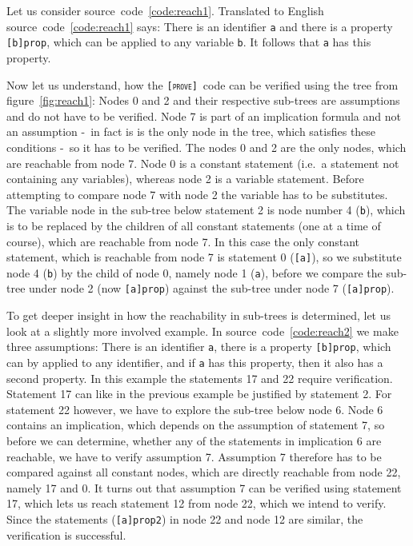 \documentclass[british]{article}
\newcommand\prv{bc}
\newcommand\m[1]{\texttt{#1}}
\newcommand\name{\texttt{\textsc{[prove]}}}
\begin{document}
Let us consider source~code~\ref{code:reach1}. Translated to English
source~code~\ref{code:reach1} says: There is an identifier \m{a} and there is a
property \m{[b]prop}, which can be applied to any variable \m{b}. It follows
that \m{a} has this property.
\newline

Now let us understand, how the \name\ code can be verified using the tree from
figure~\ref{fig:reach1}: Nodes 0 and 2 and their respective sub-trees are
assumptions and do not have to be verified. Node 7 is part of an implication
formula and not an assumption -\ in fact is is the only node in the tree, which
satisfies these conditions -\ so it has to be verified. The nodes 0 and 2 are
the only nodes, which are reachable from node 7. Node 0 is a constant statement
(i.e.\ a statement not containing any variables), whereas node 2 is a variable
statement. Before attempting to compare node 7 with node 2 the variable has to
be substitutes. The variable node in the sub-tree below statement 2 is node
number 4 (\m{b}), which is to be replaced by the children of all constant
statements (one at a time of course), which are reachable from node 7. In this
case the only constant statement, which is reachable from node 7 is statement 0
(\m{[a]}), so we substitute node 4 (\m{b}) by the child of node 0, namely node 1
(\m{a}), before we compare the sub-tree under node 2 (now \m{[a]prop}) against
the sub-tree under node 7 (\m{[a]prop}).
\newline

To get deeper insight in how the reachability in sub-trees is determined, let us
look at a slightly more involved example.  In source~code~\ref{code:reach2} we
make three assumptions: There is an identifier \m{a}, there is a property
\m{[b]prop}, which can by applied to any identifier, and if \m{a} has this
property, then it also has a second property. In this example the statements 17
and 22 require verification. Statement 17 can like in the previous example be
justified by statement 2. For statement 22 however, we have to explore the
sub-tree below node 6. Node 6 contains an implication, which depends on the
assumption of statement 7, so before we can determine, whether any of the
statements in implication 6 are reachable, we have to verify assumption 7.
Assumption 7 therefore has to be compared against all constant nodes, which are
directly reachable from node 22, namely 17 and 0. It turns out that assumption 7
can be verified using statement 17, which lets us reach statement 12 from node
22, which we intend to verify. Since the statements (\m{[a]prop2}) in node 22
and node 12 are similar, the verification is successful.
\end{document}
